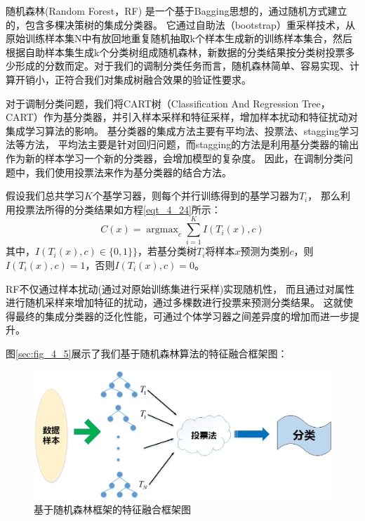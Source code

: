 随机森林(Random Forest，RF) \cite{liaw2002classification}是一个基于Bagging思想的，通过随机方式建立的，包含多棵决策树的集成分类器。
它通过自助法（bootstrap）重采样技术，从原始训练样本集N中有放回地重复随机抽取k个样本生成新的训练样本集合，然后根据自助样本集生成k个分类树组成随机森林，新数据的分类结果按分类树投票多少形成的分数而定。对于我们的调制分类任务而言，随机森林简单、容易实现、计算开销小，正符合我们对集成树融合效果的验证性要求。\par


对于调制分类问题，我们将CART树（Classification And Regression Tree，CART）\cite{breiman2017classification}作为基分类器，并引入样本采样和特征采样，增加样本扰动和特征扰动对集成学习算法的影响。
基分类器的集成方法主要有平均法、投票法、stagging学习法等方法，
平均法主要是针对回归问题，而stagging的方法是利用基分类器的输出作为新的样本学习一个新的分类器，会增加模型的复杂度\cite{周志华2016机器学习}。
因此，在调制分类问题中，我们使用投票法来作为基分类器的结合方法。\par

假设我们总共学习$K$个基学习器，则每个并行训练得到的基学习器为$T_{i}$，
那么利用投票法所得的分类结果如方程\eqref{eqt_4_24}所示：
\begin{equation}
	\label{eqt_4_24}
	C(x) = \mathop{\arg\max}_{c} \sum_{i=1}^{K} I(T_i(x), c)
\end{equation}
其中，$I(T_i(x), c) \in \{0, 1\}\}$，若基分类树$T_{i}$将样本$x$预测为类别$c$，则$I(T_i(x), c)=1$，否则$I(T_i(x), c)=0$。\par

RF不仅通过样本扰动(通过对原始训练集进行采样)实现随机性，
而且通过对属性进行随机采样来增加特征的扰动，通过多棵数进行投票来预测分类结果。
这就使得最终的集成分类器的泛化性能，可通过个体学习器之间差异度的增加而进一步提升。\par
图\ref{sec:fig_4_5}展示了我们基于随机森林算法的特征融合框架图：
\begin{figure}[!h]
	\centering
	\includegraphics[scale=0.5]{figures/chapter_4/fig_4_4}
	\caption{基于随机森林框架的特征融合框架图}\label{sec:fig_4_4}
\end{figure}

